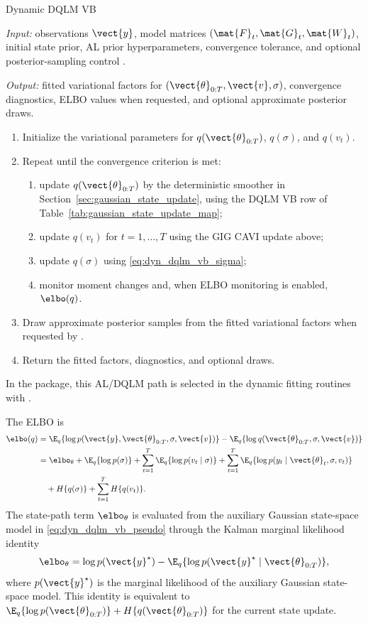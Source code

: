 \begin{suppalgorithm}{Dynamic DQLM VB}
\label{alg:dyn-dqlm-vb}
\par\noindent\emph{Input:} observations $\vect{y}$, model matrices
$(\mat{F}_t,\mat{G}_t,\mat{W}_t)$, initial state prior, AL prior
hyperparameters, convergence tolerance, and optional posterior-sampling
control .
\par\noindent\emph{Output:} fitted variational factors for
$(\vect{\theta}_{0:T},\vect{v},\sigma)$, convergence diagnostics, ELBO values
when requested, and optional approximate posterior draws.
\begin{enumerate}[label=(\arabic*)]
\item Initialize the variational parameters for $q(\vect{\theta}_{0:T})$,
$q(\sigma)$, and $q(v_t)$.
\item Repeat until the convergence criterion is met:
  \begin{enumerate}[label=(\alph*)]
  \item update $q(\vect{\theta}_{0:T})$ by the deterministic smoother in
  Section~\ref{sec:gaussian_state_update}, using the DQLM VB row of
  Table~\ref{tab:gaussian_state_update_map};
  \item update $q(v_t)$ for $t=1,\ldots,T$ using the GIG CAVI update above;
  \item update $q(\sigma)$ using \eqref{eq:dyn_dqlm_vb_sigma};
  \item monitor moment changes and, when ELBO monitoring is enabled, $\elbo(q)$.
  \end{enumerate}
\item Draw approximate posterior samples from the fitted variational factors
when requested by .
\item Return the fitted factors, diagnostics, and optional draws.
\end{enumerate}
\end{suppalgorithm}
In the package, this AL/DQLM path is selected in the dynamic fitting routines
with .

The ELBO is
\begin{align}
\elbo(q)
&=
\E_q\{\log p(\vect{y},\vect{\theta}_{0:T},\sigma,\vect{v})\}
-\E_q\{\log q(\vect{\theta}_{0:T},\sigma,\vect{v})\} \\
&=\elbo_\theta+\E_q\{\log p(\sigma)\}
+\sum_{t=1}^T\E_q\{\log p(v_t\mid\sigma)\}
+\sum_{t=1}^T\E_q\{\log p(y_t\mid\vect{\theta}_t,\sigma,v_t)\}\\
&\quad
+H\{q(\sigma)\}+\sum_{t=1}^TH\{q(v_t)\}.
\label{eq:dyn_dqlm_elbo}
\end{align}
The state-path term $\elbo_\theta$ is evaluated from the auxiliary Gaussian
state-space model in \eqref{eq:dyn_dqlm_vb_pseudo} through the Kalman marginal
likelihood identity
\begin{equation}
\elbo_\theta
=\log p(\vect{y}^{\star})
-\E_q\{\log p(\vect{y}^{\star}\mid\vect{\theta}_{0:T})\},
\label{eq:dyn_dqlm_elbo_theta}
\end{equation}
where $p(\vect{y}^{\star})$ is the marginal likelihood of the auxiliary
Gaussian state-space model. This identity is equivalent to
$\E_q\{\log p(\vect{\theta}_{0:T})\}+H\{q(\vect{\theta}_{0:T})\}$ for the
current state update.

